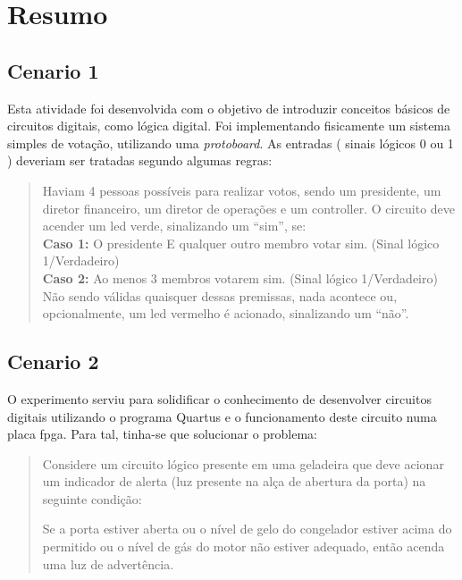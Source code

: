 \chapter{Resumo}
\section{Cenario 1}
	Esta atividade foi desenvolvida com o objetivo de introduzir
	conceitos básicos de circuitos digitais, como lógica digital.
	Foi implementando fisicamente um sistema simples de votação, utilizando uma
	\textit{protoboard}. As entradas ( sinais lógicos 0 ou 1 ) deveriam ser tratadas segundo
	algumas regras:
	\begin{quote}
		Haviam 4 pessoas possíveis para realizar votos, sendo um presidente, um diretor
		financeiro, um diretor de operações e um controller. O circuito deve acender um led
		verde, sinalizando um “sim”, se:\\
		\textbf{Caso 1:} O presidente E qualquer outro membro votar sim. (Sinal lógico 1/Verdadeiro)\\
		\textbf{Caso 2:} Ao menos 3 membros votarem sim. (Sinal lógico 1/Verdadeiro)\\
		Não sendo válidas quaisquer dessas premissas, nada acontece ou, opcionalmente, um
		led vermelho é acionado, sinalizando um “não”.
	\end{quote}

\section{Cenario 2}
	O experimento serviu para solidificar o conhecimento de desenvolver circuitos digitais utilizando o
	programa Quartus e o funcionamento deste circuito numa placa \ac{fpga}. Para tal, tinha-se que solucionar
	o problema:
	\begin{quote}
		Considere um circuito lógico presente em uma geladeira que deve acionar um
		indicador de alerta (luz presente na alça de abertura da porta) na seguinte condição:

		Se a porta estiver aberta ou o nível de gelo do congelador estiver acima do permitido ou o
		nível de gás do motor não estiver adequado, então acenda uma luz de advertência.
	\end{quote}

